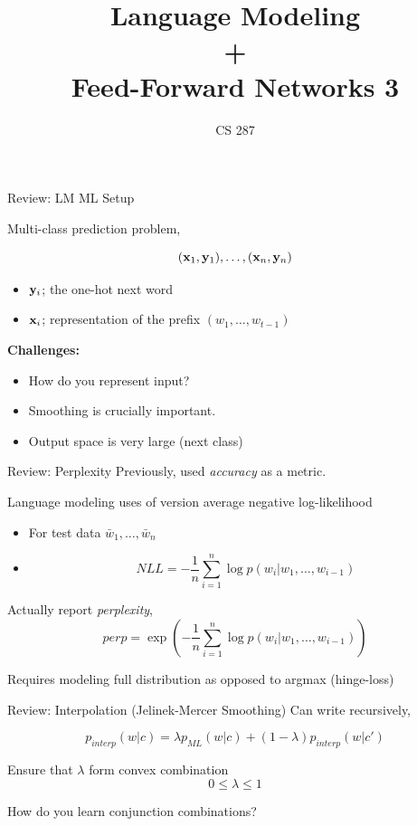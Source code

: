 \documentclass{beamer}
\title{Language Modeling \\ + \\ Feed-Forward Networks 3}
\date{}
\author{CS 287}
\begin{document}
\begin{frame}
  \titlepage
\end{frame}

\begin{frame}{Review: LM ML Setup}

  Multi-class prediction problem, 

  \[ (\mathbf{x}_1, \mathbf{y}_1), \ldots, (\mathbf{x}_n, \mathbf{y}_n) \]
  \begin{itemize}
  \item $\mathbf{y}_i$; the one-hot next word
  \item $\mathbf{x}_i$; representation of the prefix $(w_1, \ldots, w_{t-1})$
  \end{itemize}

  \textbf{Challenges:}
  \begin{itemize}
  \item How do you represent input?
  \item Smoothing is crucially important.
  \item Output space is very large (next class)
  \end{itemize}
\end{frame}

\begin{frame}{Review: Perplexity}
  Previously, used \textit{accuracy} as a metric.
  
  \air 

  Language modeling uses of version  average negative
  log-likelihood 
  \begin{itemize}
    \item For test data $\bar{w}_1, \ldots, \bar{w}_n$
    \item \[NLL = -\frac{1}{n}\sum_{i=1}^n \log p(w_i | w_1, \ldots,w_{i-1})\]
  \end{itemize}


  Actually report \textit{perplexity},
  \[ perp = \exp(-\frac{1}{n}\sum_{i=1}^n \log p(w_i | w_1, \ldots,w_{i-1})) \]

  Requires modeling full distribution as opposed to argmax (hinge-loss)
\end{frame}

\begin{frame}{Review: Interpolation (Jelinek-Mercer Smoothing)}
  Can write recursively,

  \[ p_{interp}(w |  c) =  \lambda p_{ML}(w |  c) + (1 - \lambda) p_{interp}(w | c') \]

  Ensure that $\lambda$ form convex combination
  \[0 \leq \lambda \leq 1\]

  How do you learn conjunction combinations?
\end{frame}
\end{document}
